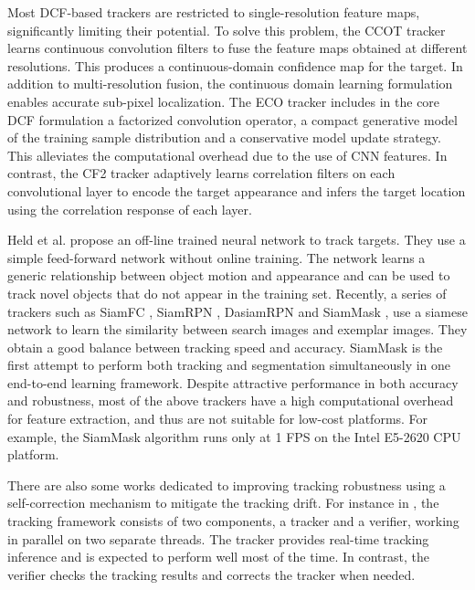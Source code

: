 Most DCF-based trackers are restricted to single-resolution feature maps, significantly limiting their potential. To solve this problem, the CCOT tracker \cite{danelljan2016beyond} learns continuous convolution filters to fuse the feature maps obtained at different resolutions. This produces a continuous-domain confidence map for the target. In addition to multi-resolution fusion, the continuous domain learning formulation enables accurate sub-pixel localization.
The ECO tracker \cite{Danelljan2017ECOEC} includes in the core DCF formulation a factorized convolution operator, a compact generative model of the training sample distribution and a conservative model update strategy. This alleviates the computational overhead due to the use of CNN features. In contrast, the CF2 tracker \cite{Ma2015HierarchicalCF} adaptively learns correlation filters on each convolutional layer to encode the target appearance and infers the target location using the correlation response of each layer.

Held et al. \cite{GOTURN} propose an off-line trained neural network to track targets. They use a simple feed-forward network without online training. The network learns a generic relationship between object motion and appearance and can be used to track novel objects that do not appear in the training set. 
Recently, a series of trackers such as SiamFC \cite{SiamFC}, SiamRPN \cite{SiamRPN}, DasiamRPN \cite{zhu2018distractor} and SiamMask \cite{Wang2018SiamMask}, use a siamese network to learn the similarity between search images and exemplar images. They obtain a good balance between tracking speed and accuracy. SiamMask is the first attempt to perform both tracking and segmentation simultaneously in one end-to-end learning framework.
Despite attractive performance in both accuracy and robustness, most of the above trackers have a high computational overhead for feature extraction, and thus are not suitable for low-cost platforms. For example, the SiamMask algorithm runs only at 1 FPS on the Intel E5-2620 CPU platform.

There are also some works dedicated to improving tracking robustness using a self-correction mechanism to mitigate the tracking drift. For instance in \cite{fan2018parallel}, the tracking framework consists of two components, a tracker and a verifier, working in parallel on two separate threads. The tracker provides real-time tracking inference and is expected to perform well most of the time. In contrast, the verifier checks the tracking results and corrects the tracker when needed.

